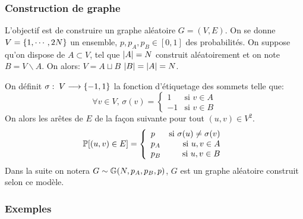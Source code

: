 \documentclass{standalone}
\begin{document}
	\subsubsection{Construction de graphe}
	
	\begin{defn}[Modèle 1]
		\label{model}
		L'objectif est de construire un graphe aléatoire $G=(V,E)$. On se donne $V = \left\{ 1, \cdots, 2N\right\}$ un ensemble, $p, p_A, p_B \in [0,1]$ des probabilités. On suppose qu'on dispose de $A \subset V$, tel que $\left| A\right| = N$ construit  aléatoirement et on note $B = V \backslash A$. On alors: $V = A \sqcup B$ $\left| B\right| = \left| A\right| = N$.
		
		On définit $\sigma:\; V \longrightarrow \left\{ -1, 1\right\}$ la fonction d'étiquetage des sommets telle que:		
		\[ 
		\forall v \in V,\, \sigma(v) = \left\{ \begin{array}{lr}
			1& \text{si } v \in A\\
			-1& \text{si } v \in B
		\end{array}\right.
		\]		
		On alors les arêtes de $E$ de la façon suivante pour tout $(u,v) \in V^2$.
		\[
		\mathbb P[(u,v) \in E] = \left\{ \begin{array}{lr}
		p& \text{si } \sigma(u) \not= \sigma(v)\\
		p_A& \text{si } u,v \in A\\
		p_B& \text{si } u,v \in B
		\end{array}\right.
		\]		
		Dans la suite on notera $G \sim \mathbb G(N, p_A, p_B, p)$, $G$ est un graphe aléatoire construit selon ce modèle.
	\end{defn}
	
	\subsubsection{Exemples}
	
\end{document}
